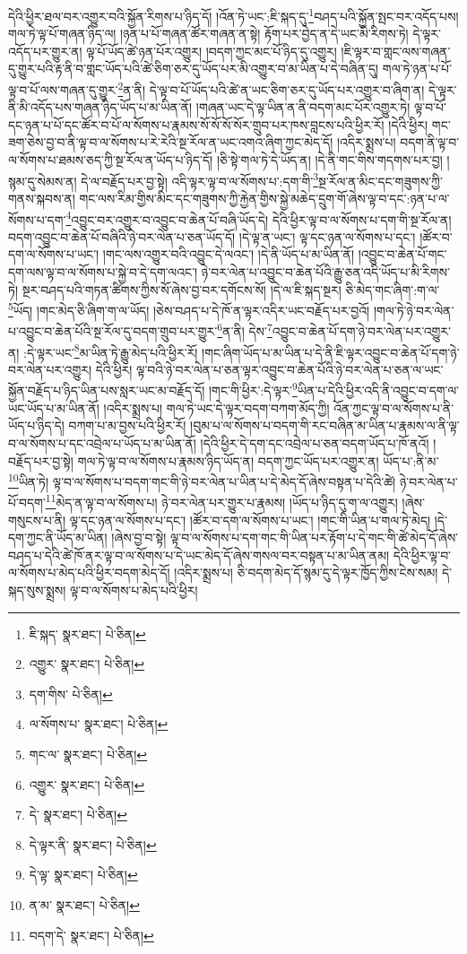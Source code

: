 དེའི་ཕྱིར་ཐལ་བར་འགྱུར་བའི་སྐྱོན་རིགས་པ་ཉིད་དོ། །འོན་ཏེ་ཡང་:ཇི་སྐད་དུ་\footnote{ཇི་སྐད་  སྣར་ཐང་།  པེ་ཅིན། }བཤད་པའི་སྐྱོན་སྤང་བར་འདོད་པས། གལ་ཏེ་ལྟ་པོ་གཞན་ཉིད་ལ། །ཉན་པ་པོ་གཞན་ཚོར་གཞན་ན་སྟེ། རྟོག་པར་བྱེད་ན་དེ་ཡང་མི་རིགས་ཏེ། དེ་ལྟར་འདོད་པར་གྱུར་ན། ལྟ་པོ་ཡོད་ཚེ་ཉན་པོར་འགྱུར། །བདག་ཀྱང་མང་པོ་ཉིད་དུ་འགྱུར། །ཇི་ལྟར་བ་གླང་ལས་གཞན་དུ་གྱུར་པའི་རྟ་ནི་བ་གླང་ཡོད་པའི་ཚེ་ཅིག་ཅར་དུ་ཡོད་པར་མི་འགྱུར་བ་མ་ཡིན་པ་དེ་བཞིན་དུ། གལ་ཏེ་ཉན་པ་པོ་ལྟ་བ་པོ་ལས་གཞན་དུ་གྱུར་\footnote{འགྱུར་  སྣར་ཐང་།  པེ་ཅིན། }ན་ནི། དེ་ལྟ་བ་པོ་ཡོད་པའི་ཚེ་ན་ཡང་ཅིག་ཅར་དུ་ཡོད་པར་འགྱུར་བ་ཞིག་ན། དེ་ལྟར་ནི་མི་འདོད་པས་གཞན་ཉིད་ཡོད་པ་མ་ཡིན་ནོ། །གཞན་ཡང་དེ་ལྟ་ཡིན་ན་ནི་བདག་མང་པོར་འགྱུར་ཏེ། ལྟ་བ་པོ་དང་ཉན་པ་པོ་དང་ཚོར་བ་པོ་ལ་སོགས་པ་རྣམས་སོ་སོ་སོ་སོར་གྲུབ་པར་ཁས་བླངས་པའི་ཕྱིར་རོ། །དེའི་ཕྱིར། གང་ཟག་ཅེས་བྱ་བ་ནི་ལྟ་བ་ལ་སོགས་པ་རེ་རེའི་སྔ་རོལ་ན་ཡང་འགའ་ཞིག་ཀྱང་མེད་དོ། །འདིར་སྨྲས་པ། བདག་ནི་ལྟ་བ་ལ་སོགས་པ་ཐམས་ཅད་ཀྱི་སྔ་རོལ་ན་ཡོད་པ་ཉིད་དོ། །ཅི་སྟེ་གལ་ཏེ་དེ་ཡོད་ན། །དེ་ནི་གང་གིས་གདགས་པར་བྱ། །སྙམ་དུ་སེམས་ན། དེ་ལ་བརྗོད་པར་བྱ་སྟེ། འདི་ལྟར་ལྟ་བ་ལ་སོགས་པ་:དག་གི་\footnote{དག་གིས་  པེ་ཅིན། }སྔ་རོལ་ན་མིང་དང་གཟུགས་ཀྱི་གནས་སྐབས་ན། གང་ལས་རིམ་གྱིས་མིང་དང་གཟུགས་ཀྱི་རྐྱེན་གྱིས་སྐྱེ་མཆེད་དྲུག་གོ་ཞེས་ལྟ་བ་དང་:ཉན་པ་ལ་སོགས་པ་དག་\footnote{ལ་སོགས་པ་  སྣར་ཐང་།  པེ་ཅིན། }འབྱུང་བར་འགྱུར་བ་འབྱུང་བ་ཆེན་པོ་བཞི་ཡོད་དེ། དེའི་ཕྱིར་ལྟ་བ་ལ་སོགས་པ་དག་གི་སྔ་རོལ་ན། བདག་འབྱུང་བ་ཆེན་པོ་བཞིའི་ཉེ་བར་ལེན་པ་ཅན་ཡོད་དོ། །དེ་ལྟ་ན་ཡང་། ལྟ་དང་ཉན་ལ་སོགས་པ་དང་། །ཚོར་བ་དག་ལ་སོགས་པ་ཡང་། །གང་ལས་འགྱུར་བའི་འབྱུང་དེ་ལའང་། །དེ་ནི་ཡོད་པ་མ་ཡིན་ནོ། །འབྱུང་བ་ཆེན་པོ་གང་དག་ལས་ལྟ་བ་ལ་སོགས་པ་སྐྱེ་བ་དེ་དག་ལའང་། ཉེ་བར་ལེན་པ་འབྱུང་བ་ཆེན་པོའི་རྒྱུ་ཅན་འདི་ཡོད་པ་མི་རིགས་ཏེ། སྔར་བཤད་པའི་གཏན་ཚིགས་ཀྱིས་སོ་ཞེས་བྱ་བར་དགོངས་སོ། །དེ་ལ་ཇི་སྐད་སྔར། ཅི་མེད་གང་ཞིག་:ག་ལ་\footnote{གང་ལ་  སྣར་ཐང་།  པེ་ཅིན། }ཡོད། །གང་མེད་ཅི་ཞིག་ག་ལ་ཡོད། །ཅེས་བཤད་པ་དེ་ཁོ་ན་ལྟར་འདིར་ཡང་བརྗོད་པར་བྱའོ། །གལ་ཏེ་ཉེ་བར་ལེན་པ་འབྱུང་བ་ཆེན་པོའི་སྔ་རོལ་དུ་བདག་གྲུབ་པར་གྱུར་\footnote{འགྱུར་  སྣར་ཐང་།  པེ་ཅིན། }ན་ནི། དེས་\footnote{དེ་  སྣར་ཐང་།  པེ་ཅིན། }འབྱུང་བ་ཆེན་པོ་དག་ཉེ་བར་ལེན་པར་འགྱུར་ན། :དེ་ལྟར་ཡང་\footnote{དེ་ལྟར་ནི་  སྣར་ཐང་།  པེ་ཅིན། }མ་ཡིན་ཏེ་རྒྱུ་མེད་པའི་ཕྱིར་རོ། །གང་ཞིག་ཡོད་པ་མ་ཡིན་པ་དེ་ནི་ཇི་ལྟར་འབྱུང་བ་ཆེན་པོ་དག་ཉེ་བར་ལེན་པར་འགྱུར། དེའི་ཕྱིར། ལྟ་བའི་ཉེ་བར་ལེན་པ་ཅན་ལྟར་འབྱུང་བ་ཆེན་པོའི་ཉེ་བར་ལེན་པ་ཅན་ལ་ཡང་སྐྱོན་བརྗོད་པ་ཉིད་ཡིན་པས་སླར་ཡང་མ་བརྗོད་དོ། །གང་གི་ཕྱིར་:དེ་ལྟར་\footnote{དེ་ལྟ་  སྣར་ཐང་།  པེ་ཅིན། }ཡིན་པ་དེའི་ཕྱིར་འདི་ནི་འབྱུང་བ་དག་ལ་ཡང་ཡོད་པ་མ་ཡིན་ནོ། །འདིར་སྨྲས་པ། གལ་ཏེ་ཡང་དེ་ལྟར་བདག་བཀག་མོད་ཀྱི། འོན་ཀྱང་ལྟ་བ་ལ་སོགས་པ་ནི་ཡོད་པ་ཉིད་དེ། བཀག་པ་མ་བྱས་པའི་ཕྱིར་རོ། །བུམ་པ་ལ་སོགས་པ་བདག་གི་རང་བཞིན་མ་ཡིན་པ་རྣམས་ལ་ནི་ལྟ་བ་ལ་སོགས་པ་དང་འབྲེལ་པ་ཡོད་པ་མ་ཡིན་ནོ། །དེའི་ཕྱིར་དེ་དག་དང་འབྲེལ་པ་ཅན་བདག་ཡོད་པ་ཁོ་ནའོ། །བརྗོད་པར་བྱ་སྟེ། གལ་ཏེ་ལྟ་བ་ལ་སོགས་པ་རྣམས་ཉིད་ཡོད་ན། བདག་ཀྱང་ཡོད་པར་འགྱུར་ན། ཡོད་པ་:ནི་མ་\footnote{ན་མ་  སྣར་ཐང་།  པེ་ཅིན། }ཡིན་ཏེ། ལྟ་བ་ལ་སོགས་པ་བདག་གང་གི་ཉེ་བར་ལེན་པ་ཡིན་པ་དེ་མེད་དོ་ཞེས་བསྟན་པ་དེའི་ཚེ། ཉེ་བར་ལེན་པ་པོ་བདག་\footnote{བདག་དེ་  སྣར་ཐང་།  པེ་ཅིན། }མེད་ན་ལྟ་བ་ལ་སོགས་པ། ཉེ་བར་ལེན་པར་གྱུར་པ་རྣམས། །ཡོད་པ་ཉིད་དུ་ག་ལ་འགྱུར། །ཞེས་གསུངས་པ་ནི། ལྟ་དང་ཉན་ལ་སོགས་པ་དང་། །ཚོར་བ་དག་ལ་སོགས་པ་ཡང་། །གང་གི་ཡིན་པ་གལ་ཏེ་མེད། །དེ་དག་ཀྱང་ནི་ཡོད་མ་ཡིན། །ཞེས་བྱ་བ་སྟེ། ལྟ་བ་ལ་སོགས་པ་དག་གང་གི་ཡིན་པར་རྟོག་པ་དེ་གང་གི་ཚེ་མེད་དོ་ཞེས་བཤད་པ་དེའི་ཚེ་ཁོ་ནར་ལྟ་བ་ལ་སོགས་པ་དེ་ཡང་མེད་དོ་ཞེས་གསལ་བར་བསྟན་པ་མ་ཡིན་ནམ། དེའི་ཕྱིར་ལྟ་བ་ལ་སོགས་པ་མེད་པའི་ཕྱིར་བདག་མེད་དོ། །འདིར་སྨྲས་པ། ཅི་བདག་མེད་དོ་སྙམ་དུ་དེ་ལྟར་ཁྱོད་ཀྱིས་ངེས་སམ། དེ་སྐད་སུས་སྨྲས། ལྟ་བ་ལ་སོགས་པ་མེད་པའི་ཕྱིར། 